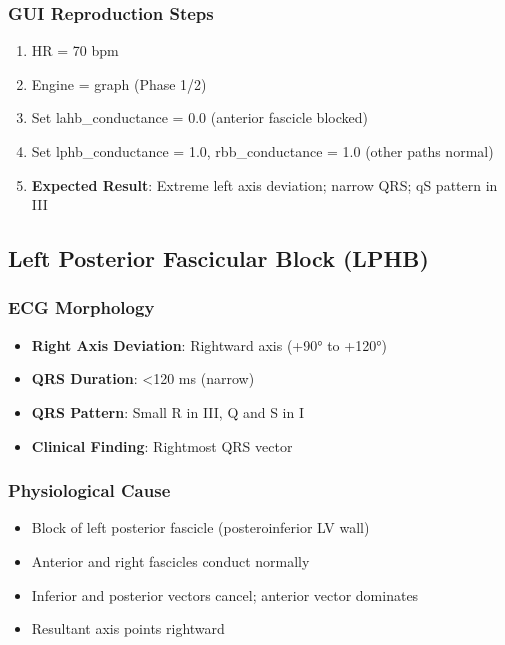 \documentclass[11pt, a4paper]{article}
\begin{document}
\subsubsection{GUI Reproduction Steps}
\begin{enumerate}
    \item HR = 70 bpm
    \item Engine = graph (Phase 1/2)
    \item Set lahb\_conductance = 0.0 (anterior fascicle blocked)
    \item Set lphb\_conductance = 1.0, rbb\_conductance = 1.0 (other paths normal)
    \item \textbf{Expected Result}: Extreme left axis deviation; narrow QRS; qS pattern in III
\end{enumerate}

\subsection{Left Posterior Fascicular Block (LPHB)}

\subsubsection{ECG Morphology}
\begin{itemize}
    \item \textbf{Right Axis Deviation}: Rightward axis (+90° to +120°)
    \item \textbf{QRS Duration}: <120 ms (narrow)
    \item \textbf{QRS Pattern}: Small R in III, Q and S in I
    \item \textbf{Clinical Finding}: Rightmost QRS vector
\end{itemize}

\subsubsection{Physiological Cause}
\begin{itemize}
    \item Block of left posterior fascicle (posteroinferior LV wall)
    \item Anterior and right fascicles conduct normally
    \item Inferior and posterior vectors cancel; anterior vector dominates
    \item Resultant axis points rightward
\end{itemize}
\end{document}
